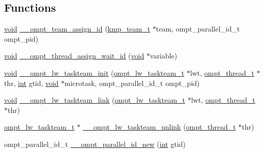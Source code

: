 \subsection*{Functions}
\begin{DoxyCompactItemize}
\item 
\hyperlink{ittnotify__static_8h_af941d56e55e3c5465135b60c4d6343ed}{void} \hyperlink{ompt-specific_8h_a42b74b829cdbf17b033acb9f5e2cdd2b}{\-\_\-\-\_\-ompt\-\_\-team\-\_\-assign\-\_\-id} (\hyperlink{kmp_8h_a95f7a64bda9b774add6c27c4a7b2a143}{kmp\-\_\-team\-\_\-t} $\ast$team, ompt\-\_\-parallel\-\_\-id\-\_\-t ompt\-\_\-pid)
\item 
\hyperlink{ittnotify__static_8h_af941d56e55e3c5465135b60c4d6343ed}{void} \hyperlink{ompt-specific_8h_a0d15ff86baf709cfb2701472bf0acf8b}{\-\_\-\-\_\-ompt\-\_\-thread\-\_\-assign\-\_\-wait\-\_\-id} (\hyperlink{ittnotify__static_8h_af941d56e55e3c5465135b60c4d6343ed}{void} $\ast$variable)
\item 
\hyperlink{ittnotify__static_8h_af941d56e55e3c5465135b60c4d6343ed}{void} \hyperlink{ompt-specific_8h_af2be58fa71f22b1ceab091f5ce800385}{\-\_\-\-\_\-ompt\-\_\-lw\-\_\-taskteam\-\_\-init} (\hyperlink{ompt-internal_8h_a9efdb170346e988130296a7bb0cb861c}{ompt\-\_\-lw\-\_\-taskteam\-\_\-t} $\ast$lwt, \hyperlink{ompt-specific_8h_aba08ad17c82d2eea9f877a3ec41e4987}{ompt\-\_\-thread\-\_\-t} $\ast$thr, \hyperlink{ittnotify__static_8h_a8b8dcd723308a8cb5d84277c7a3fff70}{int} gtid, \hyperlink{ittnotify__static_8h_af941d56e55e3c5465135b60c4d6343ed}{void} $\ast$microtask, ompt\-\_\-parallel\-\_\-id\-\_\-t ompt\-\_\-pid)
\item 
\hyperlink{ittnotify__static_8h_af941d56e55e3c5465135b60c4d6343ed}{void} \hyperlink{ompt-specific_8h_a33f18641f832437d475de8d9658cb530}{\-\_\-\-\_\-ompt\-\_\-lw\-\_\-taskteam\-\_\-link} (\hyperlink{ompt-internal_8h_a9efdb170346e988130296a7bb0cb861c}{ompt\-\_\-lw\-\_\-taskteam\-\_\-t} $\ast$lwt, \hyperlink{ompt-specific_8h_aba08ad17c82d2eea9f877a3ec41e4987}{ompt\-\_\-thread\-\_\-t} $\ast$thr)
\item 
\hyperlink{ompt-internal_8h_a9efdb170346e988130296a7bb0cb861c}{ompt\-\_\-lw\-\_\-taskteam\-\_\-t} $\ast$ \hyperlink{ompt-specific_8h_a071379c3085511265922b6d29b2b1b1a}{\-\_\-\-\_\-ompt\-\_\-lw\-\_\-taskteam\-\_\-unlink} (\hyperlink{ompt-specific_8h_aba08ad17c82d2eea9f877a3ec41e4987}{ompt\-\_\-thread\-\_\-t} $\ast$thr)
\item 
ompt\-\_\-parallel\-\_\-id\-\_\-t \hyperlink{ompt-specific_8h_a541d97d3f1e1d09a459326dd60c630ce}{\-\_\-\-\_\-ompt\-\_\-parallel\-\_\-id\-\_\-new} (\hyperlink{ittnotify__static_8h_a8b8dcd723308a8cb5d84277c7a3fff70}{int} gtid)

\end{DoxyCompactItemize}
